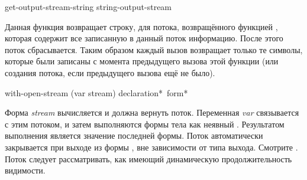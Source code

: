 \begin{defun}[Функция]
get-output-stream-string string-output-stream

Данная функция возвращает строку, для потока, возвращённого функцией
, которая содержит все записанную в данный поток
информацию. После этого поток сбрасывается. Таким образом каждый вызов
 возвращает только те символы, которые были
записаны с момента предыдущего вызова этой функции (или создания потока, если
предыдущего вызова ещё не было).
\end{defun}

\begin{defmac}
with-open-stream (var stream) {declaration}* {\,form}*

Форма \emph{stream} вычисляется и должна вернуть поток.
Переменная \emph{var} связывается с этим потоком, и затем выполняются формы тела
как неявный . Результатом выполнения  является
значение последней формы.
Поток автоматически закрывается при выходе из формы , вне
зависимости от типа выхода. Смотрите .
Поток следует рассматривать, как имеющий динамическую продолжительность
видимости.
\end{defmac}

